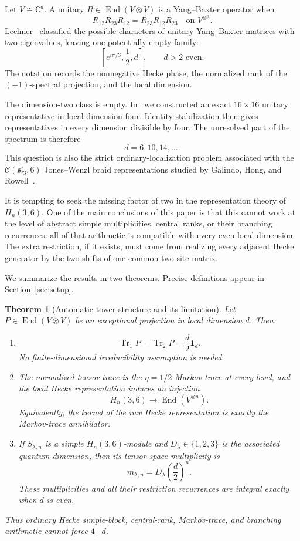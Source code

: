 \documentclass[11pt]{article}
\newtheorem{theorem}{Theorem}[section]
\theoremstyle{definition}
\theoremstyle{remark}
\newcommand{\Id}{\mathbf 1}
\newcommand{\Tr}{\operatorname{Tr}}
\newcommand{\End}{\operatorname{End}}
\newcommand{\bbC}{\mathbb C}
\newcommand{\cC}{\mathcal C}
\begin{document}
Let \(V\cong\bbC^d\). A unitary
\(R\in\End(V\otimes V)\) is a Yang--Baxter operator when
\begin{equation}
  R_{12}R_{23}R_{12}=R_{23}R_{12}R_{23}
  \quad\text{on }V^{\otimes3}.
  \label{eq:YBE}
\end{equation}
Lechner~\cite{Lechner2026} classified the possible characters of unitary
Yang--Baxter matrices with two eigenvalues, leaving one potentially empty
family:
\[
  \left[e^{i\pi/3},\frac12,d\right],
  \qquad d>2\text{ even}.
\]
The notation records the nonnegative Hecke phase, the normalized rank of
the \((-1)\)-spectral projection, and the local dimension.

The dimension-two class is empty. In~\cite{Kriebel2026d4} we constructed an
exact \(16\times16\) unitary representative in local dimension four.
Identity stabilization then gives representatives in every dimension
divisible by four. The unresolved part of the spectrum is therefore
\[
  d=6,10,14,\ldots.
\]
This question is also the strict ordinary-localization problem associated
with the \(\cC(\mathfrak{sl}_3,6)\) Jones--Wenzl braid representations
studied by Galindo, Hong, and Rowell~\cite{GHR2013}.

It is tempting to seek the missing factor of two in the representation
theory of \(H_n(3,6)\). One of the main conclusions of this paper is that
this cannot work at the level of abstract simple multiplicities, central
ranks, or their branching recurrences: all of that arithmetic is compatible
with every even local dimension. The extra restriction, if it exists, must
come from realizing every adjacent Hecke generator by the two shifts of one
common two-site matrix.

We summarize the results in two theorems. Precise definitions appear in
Section~\ref{sec:setup}.

\begin{theorem}[Automatic tower structure and its limitation]
\label{thm:tower-summary}
Let \(P\in\End(V\otimes V)\) be an exceptional projection in local
dimension \(d\). Then:
\begin{enumerate}[label=\textup{(\roman*)}]
\item
\[
  \Tr_1P=\Tr_2P=\frac d2\Id_d.
\]
No finite-dimensional irreducibility assumption is needed.
\item The normalized tensor trace is the \(\eta=1/2\) Markov trace at
every level, and the local Hecke representation induces an injection
\[
  H_n(3,6)\longrightarrow\End(V^{\otimes n}).
\]
Equivalently, the kernel of the raw Hecke representation is exactly the
Markov-trace annihilator.
\item If \(S_{\lambda,n}\) is a simple \(H_n(3,6)\)-module and
\(D_\lambda\in\{1,2,3\}\) is the associated quantum dimension, then its
tensor-space multiplicity is
\[
  m_{\lambda,n}=D_\lambda\left(\frac d2\right)^n.
\]
These multiplicities and all their restriction recurrences are integral
exactly when \(d\) is even.
\end{enumerate}
Thus ordinary Hecke simple-block, central-rank, Markov-trace, and branching
arithmetic cannot force \(4\mid d\).
\end{theorem}
\end{document}
